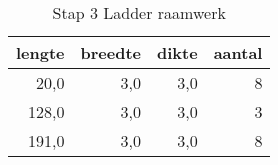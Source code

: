 \begin{table}[h!]
\centering
\caption{Stap 3 Ladder raamwerk}
\begin{tabular}{rrrr}
\toprule
 lengte &  breedte &  dikte &  aantal \\
\midrule
   20,0 &      3,0 &    3,0 &       8 \\
  128,0 &      3,0 &    3,0 &       3 \\
  191,0 &      3,0 &    3,0 &       8 \\
\bottomrule
\end{tabular}
\end{table}
